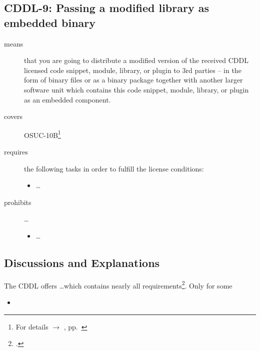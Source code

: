 \subsection{CDDL-9: Passing a modified library as embedded binary}
\label{OSUC-10B-CDDL}

\begin{description}
\item[means] that you are going to distribute a modified version of the received
CDDL licensed code snippet, module, library, or plugin to 3rd parties -- in the
form of binary files or as a binary package together with another larger
software unit which contains this code snippet, module, library, or plugin as an
embedded component.
\item[covers] OSUC-10B\footnote{For details $\rightarrow$ \oslic, pp.\
\pageref{OSUC-10B-DEF}}
\item[requires] the following tasks in order to fulfill the license conditions:
\begin{itemize}
  
  \item \ldots
  
\end{itemize}

\item[prohibits] \ldots
\begin{itemize}
  \item \ldots
\end{itemize}
\end{description}

\subsection{Discussions and Explanations}
\label{CDDLDiscussion}

The CDDL offers \ldots which contains nearly all
requirements\footcite[cf.][\nopage wp.\ §3]{Cddl10OsiLicense2004a}. Only for some

\begin{itemize}

  \item 

\end{itemize}


%

